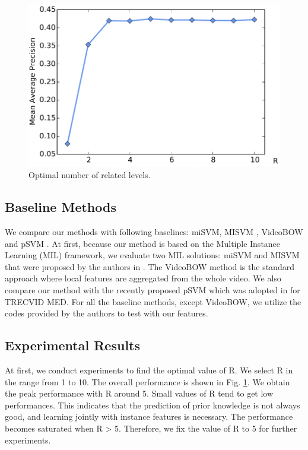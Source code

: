 \begin{figure}
	\centering
	\includegraphics[width=1\textwidth]{figure_3.pdf}
	\caption{Optimal number of related levels.}
	\label{figure_3}
\end{figure}


\subsection{Baseline Methods} We compare our methods with following baselines: miSVM, MISVM \cite{andrews2002support}, VideoBOW and pSVM \cite{lai2014video}. At first, because our method is based on the Multiple Instance Learning (MIL) framework, we evaluate two MIL solutions: miSVM and MISVM that were proposed by the authors in \cite{andrews2002support}. The VideoBOW method is the standard approach where local features are aggregated from the whole video. We also compare our method with the recently proposed pSVM which was adopted in \cite{lai2014video} for TRECVID MED. For all the baseline methods, except VideoBOW, we utilize the codes provided by the authors to test with our features.


\subsection{Experimental Results}
At first, we conduct experiments to find the optimal value of R. We select R in the range from 1 to 10. The overall performance is shown in Fig. \ref{figure_3}. We obtain the peak performance with R around 5. Small values of R tend to get low performances. This indicates that the prediction of prior knowledge is not always good, and learning jointly with instance features is necessary. The performance becomes saturated when R > 5. Therefore, we fix the value of R to 5 for further experiments.

